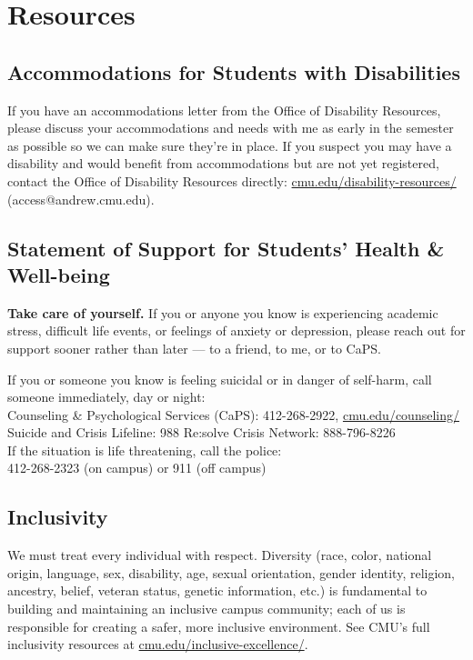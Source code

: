 \section{Resources}
 
\subsection{Accommodations for Students with Disabilities}
If you have an accommodations letter from the Office of Disability Resources, 
please discuss your accommodations and needs with me as early in the semester as possible so we can make sure they're in place. 
If you suspect you may have a disability and would benefit from accommodations but are not yet registered, 
contact the Office of Disability Resources directly: \url{cmu.edu/disability-resources/} (access@andrew.cmu.edu).
 
\subsection{Statement of Support for Students’ Health \& Well-being}
\textbf{Take care of yourself.} If you or anyone you know is experiencing academic stress, difficult life events, 
or feelings of anxiety or depression, please reach out for support sooner rather than later --- 
to a friend, to me, or to CaPS.
 
 \begin{tcolorbox}[colback=blue!5,colframe=blue!75!black]
If you or someone you know is feeling suicidal or in danger of self-harm, call someone immediately, day or night:\\
 
Counseling \& Psychological Services (CaPS): 412-268-2922, \url{cmu.edu/counseling/}\\
Suicide and Crisis Lifeline: 988 \hspace*{5em} Re:solve Crisis Network: 888-796-8226\\ 
 
If the situation is life threatening, call the police:\\ 
412-268-2323 (on campus) or 911 (off campus)
\end{tcolorbox}
 \vspace{-1em} 
\subsection{Inclusivity}
We must treat every individual with respect. 
Diversity (race, color, national origin, language, sex, disability, age, sexual orientation, 
gender identity, religion, ancestry, belief, veteran status, genetic information, etc.)
is fundamental to building and maintaining an inclusive campus community; 
each of us is responsible for creating a safer, more inclusive environment. 
See CMU's full inclusivity resources at \url{cmu.edu/inclusive-excellence/}.
 
